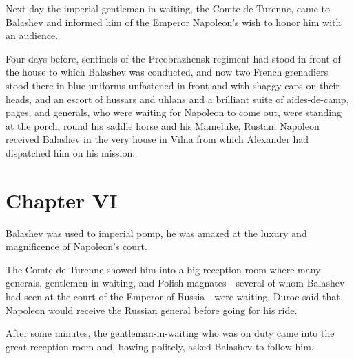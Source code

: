 Next day the imperial gentleman-in-waiting, the Comte de Turenne,
came to Balashev and informed him of the Emperor Napoleon's wish
to honor him with an audience.

Four days before, sentinels of the Preobrazhensk regiment had
stood in front of the house to which Balashev was conducted, and
now two French grenadiers stood there in blue uniforms unfastened
in front and with shaggy caps on their heads, and an escort of
hussars and uhlans and a brilliant suite of aides-de-camp, pages,
and generals, who were waiting for Napoleon to come out, were
standing at the porch, round his saddle horse and his Mameluke,
Rustan. Napoleon received Balashev in the very house in Vilna
from which Alexander had dispatched him on his mission.


\chapter*{Chapter VI}
\ifaudio     
{} 
\fi

 Balashev was used to imperial pomp, he was amazed at the
luxury and magnificence of Napoleon's court.

The Comte de Turenne showed him into a big reception room where
many generals, gentlemen-in-waiting, and Polish
magnates---several of whom Balashev had seen at the court of the
Emperor of Russia---were waiting.  Duroc said that Napoleon would
receive the Russian general before going for his ride.

After some minutes, the gentleman-in-waiting who was on duty came
into the great reception room and, bowing politely, asked
Balashev to follow him.

